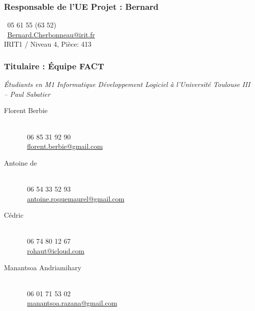 		\subsubsection{Responsable de l'UE Projet : Bernard }
	\begin{flushleft} 
		\Telefon~05 61 55 (63 52)\\
		\Letter~\href{mailto:Bernard.Cherbonneau@irit.fr}{Bernard.Cherbonneau@irit.fr}\\
		IRIT1 / Niveau 4, Pièce: 413
	\end{flushleft}
	\newpage
	\subsubsection{Titulaire : Équipe FACT}
	\textit{Étudiants en M1 Informatique Développement Logiciel à l'Université Toulouse III -- Paul Sabatier}
	\begin{description}
		\item[Florent Berbie]~ \\
	\Telefon~06 85 31 92 90 \\
	\Letter~\href{mailto:florent.berbie@gmail.com}{florent.berbie@gmail.com} \\
	
\item[Antoine de ] ~\\
	\Telefon~06 54 33 52 93\\
	\Letter~\href{mailto:antoine.roquemaurel@gmail.com}{antoine.roquemaurel@gmail.com} \\
	
\item[Cédric ]~\\ 
	\Telefon~06 74 80 12 67\\
	\Letter~\href{mailto:rohaut@icloud.com}{rohaut@icloud.com} \\
	
\item[Manantsoa Andriamihary ] ~\\
	\Telefon~06 01 71 53 02\\
	\Letter~\href{mailto:manantsoa.razana@gmail.com}{manantsoa.razana@gmail.com}
\end{description}



